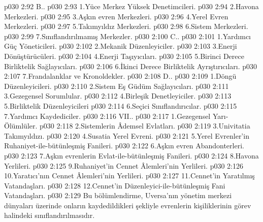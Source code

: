 \vs p030 2:92 B.\bibnobreakspace {}.
\vs p030 2:93 1.\bibnobreakspace Yüce Merkez Yüksek Denetimcileri.
\vs p030 2:94 2.\bibnobreakspace Havona Merkezleri.
\vs p030 2:95 3.\bibnobreakspace Aşkın evren Merkezleri.
\vs p030 2:96 4.\bibnobreakspace Yerel Evren Merkezleri.
\vs p030 2:97 5.\bibnobreakspace Takımyıldız Merkezleri.
\vs p030 2:98 6.\bibnobreakspace Sistem Merkezleri.
\vs p030 2:99 7.\bibnobreakspace Sınıflandırılmamış Merkezler.
\vs p030 2:100 C.\bibnobreakspace {}.
\vs p030 2:101 1.\bibnobreakspace Yardımcı Güç Yöneticileri.
\vs p030 2:102 2.\bibnobreakspace Mekanik Düzenleyiciler.
\vs p030 2:103 3.\bibnobreakspace Enerji Dönüştürücüleri.
\vs p030 2:104 4.\bibnobreakspace Enerji Taşıyıcıları.
\vs p030 2:105 5.\bibnobreakspace Birinci Derece Birliktelik Sağlayıcıları.
\vs p030 2:106 6.\bibnobreakspace İkinci Derece Birliktelik Ayrıştırıcıları.
\vs p030 2:107 7.\bibnobreakspace Frandalanklar ve Kronoldekler.
\vs p030 2:108 D.\bibnobreakspace {}.
\vs p030 2:109 1.\bibnobreakspace Döngü Düzenleyicileri.
\vs p030 2:110 2.\bibnobreakspace Sistem Eş Güdüm Sağlayıcıları.
\vs p030 2:111 3.\bibnobreakspace Gezegensel Sorumlular.
\vs p030 2:112 4.\bibnobreakspace Birleşik Denetleyiciler.
\vs p030 2:113 5.\bibnobreakspace Birliktelik Düzenleyicileri
\vs p030 2:114 6.\bibnobreakspace Seçici Sınıflandırıcılar.
\vs p030 2:115 7.\bibnobreakspace Yardımcı Kaydediciler.
\vs p030 2:116 VII.\bibnobreakspace {}.
\vs p030 2:117 1.\bibnobreakspace Gezegensel Yarı\hyp{}Ölümlüler.
\vs p030 2:118 2.\bibnobreakspace Sistemlerin Âdemsel Evlatları.
\vs p030 2:119 3.\bibnobreakspace Univitatia Takımyıldızı.
\vs p030 2:120 4.\bibnobreakspace Susatia Yerel Evreni.
\vs p030 2:121 5.\bibnobreakspace Yerel Evrenler’in Ruhaniyet\hyp{}ile\hyp{}bütünleşmiş Fanileri.
\vs p030 2:122 6.\bibnobreakspace Aşkın evren Abandonterleri.
\vs p030 2:123 7.\bibnobreakspace Aşkın evrenlerin Evlat\hyp{}ile\hyp{}bütünleşmiş Fanileri.
\vs p030 2:124 8.\bibnobreakspace Havona Yerlileri.
\vs p030 2:125 9.\bibnobreakspace Ruhaniyet’in Cennet Âlemleri’nin Yerlileri.
\vs p030 2:126 10.\bibnobreakspace Yaratıcı’nın Cennet Âlemleri’nin Yerlileri.
\vs p030 2:127 11.\bibnobreakspace Cennet’in Yaratılmış Vatandaşları.
\vs p030 2:128 12.\bibnobreakspace Cennet’in Düzenleyici\hyp{}ile\hyp{}bütünleşmiş Fani Vatandaşları.
\vs p030 2:129 Bu bölümlendirme, Uversa’nın yönetim merkezi dünyaları üzerinde onların kaydedildikleri şekliyle evrenlerin kişiliklerinin görev halindeki sınıflandırılmasıdır.
